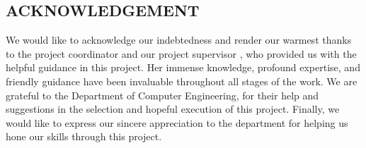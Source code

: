 \begin{center}



    \section*{ACKNOWLEDGEMENT}
    \justify
    We would like to acknowledge our indebtedness and render our warmest thanks to the project coordinator and our project supervisor {\thesupervisor}, who provided us with the helpful guidance in this project. Her immense knowledge, profound expertise, and friendly guidance have been invaluable throughout all stages of the work. We are grateful to the Department of  Computer Engineering, {\thecampus} for their help and suggestions in the selection and hopeful execution of this project. Finally, we would like to express our sincere appreciation to the department for helping us hone our skills through this project.\\

    \vspace{0.6in}
    \noindent {\theauthor}


\end{center}
